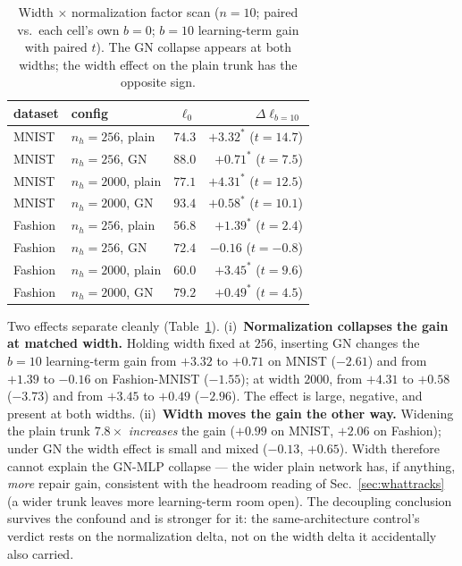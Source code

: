 \documentclass[10pt]{article}
\begin{document}
\begin{table}[t]
\centering\small
\caption{Width $\times$ normalization factor scan ($n{=}10$; paired
vs.\ each cell's own $b{=}0$; $b{=}10$ learning-term gain with paired
$t$). The GN collapse appears at both widths; the width effect on the
plain trunk has the opposite sign.}
\label{tab:twobytwo}
\begin{tabular}{llrr}
\toprule
dataset & config & $\ell_0$ & $\Delta\ell_{b=10}$ \\
\midrule
MNIST & $n_h{=}256$, plain & $74.3$ & $+3.32^{*}$ ($t{=}14.7$) \\
MNIST & $n_h{=}256$, GN    & $88.0$ & $+0.71^{*}$ ($t{=}7.5$) \\
MNIST & $n_h{=}2000$, plain & $77.1$ & $+4.31^{*}$ ($t{=}12.5$) \\
MNIST & $n_h{=}2000$, GN    & $93.4$ & $+0.58^{*}$ ($t{=}10.1$) \\
\midrule
Fashion & $n_h{=}256$, plain & $56.8$ & $+1.39^{*}$ ($t{=}2.4$) \\
Fashion & $n_h{=}256$, GN    & $72.4$ & $-0.16$ ($t{=}-0.8$) \\
Fashion & $n_h{=}2000$, plain & $60.0$ & $+3.45^{*}$ ($t{=}9.6$) \\
Fashion & $n_h{=}2000$, GN    & $79.2$ & $+0.49^{*}$ ($t{=}4.5$) \\
\bottomrule
\end{tabular}
\end{table}

Two effects separate cleanly (Table~\ref{tab:twobytwo}).
(i)~\textbf{Normalization collapses the gain at matched width.}
Holding width fixed at $256$, inserting GN changes the $b{=}10$
learning-term gain from $+3.32$ to $+0.71$ on MNIST ($-2.61$) and from
$+1.39$ to $-0.16$ on Fashion-MNIST ($-1.55$); at width $2000$, from
$+4.31$ to $+0.58$ ($-3.73$) and from $+3.45$ to $+0.49$ ($-2.96$).
The effect is large, negative, and present at both widths.
(ii)~\textbf{Width moves the gain the other way.} Widening the plain
trunk $7.8\times$ \emph{increases} the gain ($+0.99$ on MNIST,
$+2.06$ on Fashion); under GN the width effect is small and mixed
($-0.13$, $+0.65$). Width therefore cannot explain the GN-MLP
collapse --- the wider plain network has, if anything, \emph{more}
repair gain, consistent with the headroom reading of
Sec.~\ref{sec:whattracks} (a wider trunk leaves more learning-term
room open). The decoupling conclusion survives the confound and is
stronger for it: the same-architecture control's verdict rests on the
normalization delta, not on the width delta it accidentally also
carried.
\end{document}
